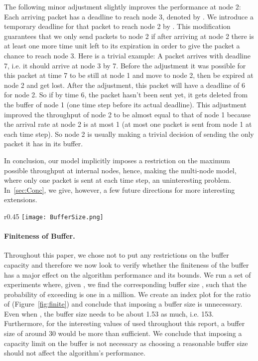 \documentclass[oribibl]{llncs}
\begin{document}
The following minor adjustment slightly improves the performance at
node 2: Each arriving packet has a deadline to reach node 3, denoted
by . We introduce a temporary deadline for that packet to reach
node 2 by . This modification guarantees that we only send packets to
node 2 if after arriving at node 2 there is at least one more time
unit left to its expiration in order to give the packet a chance to
reach node 3. Here is a trivial example: A packet arrives with
deadline 7, i.e. it should arrive at node 3 by 7. Before the
adjustment it was possible for this packet at time 7 to be still at
node 1 and move to node 2, then be expired at node 2 and get
lost. After the adjustment, this packet will have a deadline of 6 for
node 2. So if by time 6, the packet hasn't been sent yet, it gets
deleted from the buffer of node 1 (one time step before its actual
deadline). This adjustment improved the throughput of node 2 to be
almost equal to that of node 1 because the arrival rate at node 2 is
at most 1 (at most one packet is sent from node 1 at each time
step). So node 2 is usually making a trivial decision of sending the
only packet it has in its buffer.

In conclusion, our model
implicitly imposes a restriction on the maximum possible throughput at internal
nodes, hence, making the multi-node model, where only one packet is
sent at each time step, an uninteresting problem. In~\ref{sec:Conc}, we give, however, a few future directions for more interesting extensions.


\begin{wrapfigure}[10]{r}{0.45\textwidth}
\vspace{-20pt}
\texttt{[image: BufferSize.png]}
\caption{  vs. }
\label{fig:finite}
\end{wrapfigure}

\paragraph{Finiteness of Buffer.} Throughout this paper, we chose not to put any restrictions on the buffer capacity and therefore we now look to verify whether the finiteness of the buffer has a major effect on the algorithm performance and its bounds. We run a set of experiments where, given , we find the corresponding buffer size , such that the probability of exceeding  is one in a million. We create an index plot for the ratio of  (Figure~\ref{fig:finite}) and conclude that imposing a buffer size is unnecessary. Even when , the buffer size needs to be about 1.53 as much, i.e. 153.  Furthermore, for the interesting values of  used throughout this report, a buffer size of around 30 would be more than sufficient. We conclude that imposing a capacity limit on the buffer is not necessary as choosing a
reasonable buffer size should not affect the algorithm's
performance.
\end{document}
